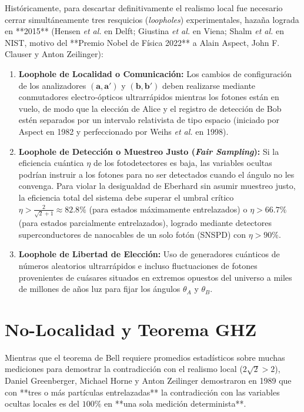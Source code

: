 \documentclass[11pt,a4paper]{book}
\begin{document}
Históricamente, para descartar definitivamente el realismo local fue necesario cerrar simultáneamente tres resquicios (\textit{loopholes}) experimentales, hazaña lograda en **2015** (Hensen \textit{et al.} en Delft; Giustina \textit{et al.} en Viena; Shalm \textit{et al.} en NIST, motivo del **Premio Nobel de Física 2022** a Alain Aspect, John F. Clauser y Anton Zeilinger):
\begin{enumerate}
    \item \textbf{Loophole de Localidad o Comunicación:} Los cambios de configuración de los analizadores $(\mathbf{a}, \mathbf{a}')$ y $(\mathbf{b}, \mathbf{b}')$ deben realizarse mediante conmutadores electro-ópticos ultrarrápidos mientras los fotones están en vuelo, de modo que la elección de Alice y el registro de detección de Bob estén separados por un intervalo relativista de tipo espacio (iniciado por Aspect en 1982 y perfeccionado por Weihs \textit{et al.} en 1998).
    \item \textbf{Loophole de Detección o Muestreo Justo (\textit{Fair Sampling}):} Si la eficiencia cuántica $\eta$ de los fotodetectores es baja, las variables ocultas podrían instruir a los fotones para no ser detectados cuando el ángulo no les convenga. Para violar la desigualdad de Eberhard sin asumir muestreo justo, la eficiencia total del sistema debe superar el umbral crítico $\eta > \frac{2}{\sqrt{2}+1} \approx 82.8\%$ (para estados máximamente entrelazados) o $\eta > 66.7\%$ (para estados parcialmente entrelazados), logrado mediante detectores superconductores de nanocables de un solo fotón (SNSPD) con $\eta > 90\%$.
    \item \textbf{Loophole de Libertad de Elección:} Uso de generadores cuánticos de números aleatorios ultrarrápidos e incluso fluctuaciones de fotones provenientes de cuásares situados en extremos opuestos del universo a miles de millones de años luz para fijar los ángulos $\theta_A$ y $\theta_B$.
\end{enumerate}

\section[Teorema GHZ y no-localidad]{No-Localidad y Teorema GHZ}

Mientras que el teorema de Bell requiere promedios estadísticos sobre muchas mediciones para demostrar la contradicción con el realismo local ($2\sqrt{2} > 2$), Daniel Greenberger, Michael Horne y Anton Zeilinger demostraron en 1989 que con **tres o más partículas entrelazadas** la contradicción con las variables ocultas locales es del $100\%$ en **una sola medición determinista**.
\end{document}
